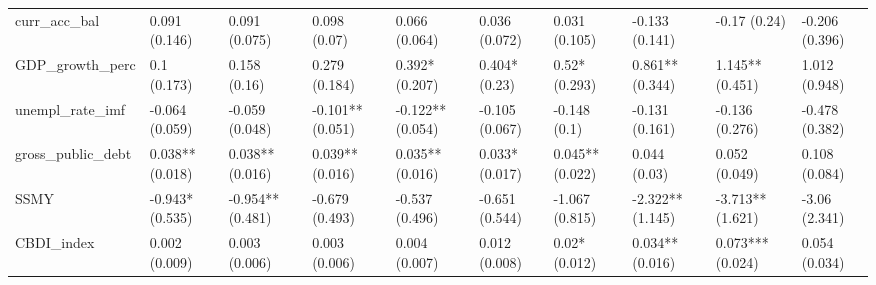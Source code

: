 \begin{table}[ht]
\begin{tabular}{llllllllll}
  curr\_acc\_bal & 0.091 (0.146) & 0.091 (0.075) & 0.098 (0.07) & 0.066 (0.064) & 0.036 (0.072) & 0.031 (0.105) & -0.133 (0.141) & -0.17 (0.24) & -0.206 (0.396) \\ 
  GDP\_growth\_perc & 0.1 (0.173) & 0.158 (0.16) & 0.279 (0.184) & 0.392* (0.207) & 0.404* (0.23) & 0.52* (0.293) & 0.861** (0.344) & 1.145** (0.451) & 1.012 (0.948) \\ 
  unempl\_rate\_imf & -0.064 (0.059) & -0.059 (0.048) & -0.101** (0.051) & -0.122** (0.054) & -0.105 (0.067) & -0.148 (0.1) & -0.131 (0.161) & -0.136 (0.276) & -0.478 (0.382) \\ 
  gross\_public\_debt & 0.038** (0.018) & 0.038** (0.016) & 0.039** (0.016) & 0.035** (0.016) & 0.033* (0.017) & 0.045** (0.022) & 0.044 (0.03) & 0.052 (0.049) & 0.108 (0.084) \\ 
  SSMY & -0.943* (0.535) & -0.954** (0.481) & -0.679 (0.493) & -0.537 (0.496) & -0.651 (0.544) & -1.067 (0.815) & -2.322** (1.145) & -3.713** (1.621) & -3.06 (2.341) \\ 
  CBDI\_index & 0.002 (0.009) & 0.003 (0.006) & 0.003 (0.006) & 0.004 (0.007) & 0.012 (0.008) & 0.02* (0.012) & 0.034** (0.016) & 0.073*** (0.024) & 0.054 (0.034) \\ 
   \bottomrule
\end{tabular}
\endgroup
\end{table}
